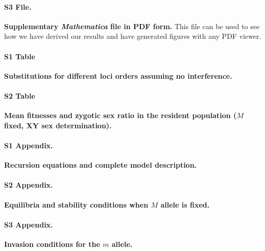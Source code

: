 \documentclass[10pt,letterpaper]{article}
\begin{document}
\paragraph*{S3 File.}
\label{file:MathematicaPDF}
{\bf Supplementary \textit{Mathematica} file in PDF form.}  This file can be used to see how we have derived our results and have generated figures with any PDF viewer. 

\paragraph*{S1 Table}
\label{tab:chisubstitutions}
{\bf Substitutions for different loci orders assuming no interference.}

\paragraph*{S2 Table}
\label{tab:meanfitnesses}
{\bf Mean fitnesses and zygotic sex ratio in the resident population ($M$ fixed, XY sex determination). }

\paragraph*{S1 Appendix.}
\label{app:recurs}
{\bf Recursion equations and complete model description.} 

\paragraph*{S2 Appendix.}
\label{app:eq_stab}
{\bf Equilibria and stability conditions when $M$ allele is fixed. } 

\paragraph*{S3 Appendix.}
\label{app:inv_cond}
{\bf Invasion conditions for the $m$ allele.} 

\end{document}
